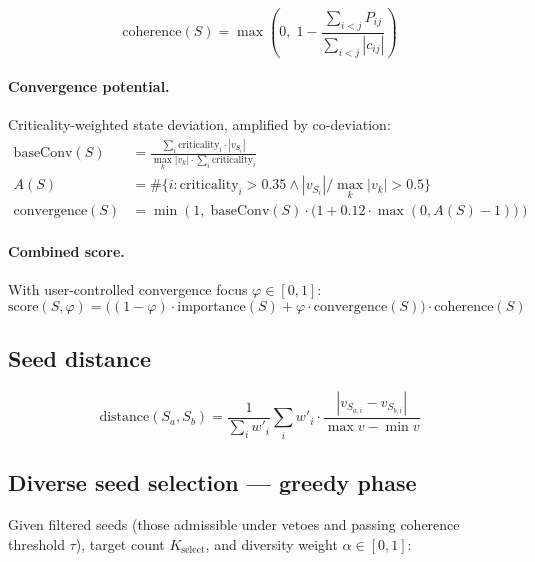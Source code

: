 \documentclass[11pt,a4paper]{article}
\begin{document}
\begin{equation}
\text{coherence}(S) = \max\left(0, \; 1 - \frac{\sum_{i<j} P_{ij}}{\sum_{i<j} |c_{ij}|}\right)
\end{equation}

\paragraph{Convergence potential.} Criticality-weighted state deviation, amplified by co-deviation:
\begin{align}
\text{baseConv}(S) &= \frac{\sum_i \text{criticality}_i \cdot |v_{S_i}|}{\max_k |v_k| \cdot \sum_i \text{criticality}_i}\\
A(S) &= \#\{i : \text{criticality}_i > 0.35 \land |v_{S_i}|/\max_k |v_k| > 0.5\}\\
\text{convergence}(S) &= \min\left(1, \; \text{baseConv}(S) \cdot \big(1 + 0.12 \cdot \max(0, A(S) - 1)\big)\right)
\end{align}

\paragraph{Combined score.} With user-controlled convergence focus $\varphi \in [0, 1]$:
\begin{equation}
\text{score}(S, \varphi) = \big((1-\varphi) \cdot \text{importance}(S) + \varphi \cdot \text{convergence}(S)\big) \cdot \text{coherence}(S)
\end{equation}

\subsection{Seed distance}

\begin{equation}
\text{distance}(S_a, S_b) = \frac{1}{\sum_i w'_i} \sum_i w'_i \cdot \frac{|v_{S_{a,i}} - v_{S_{b,i}}|}{\max v - \min v}
\end{equation}

\subsection{Diverse seed selection — greedy phase}

Given filtered seeds (those admissible under vetoes and passing coherence threshold $\tau$), target count $K_{\text{select}}$, and diversity weight $\alpha \in [0, 1]$:
\end{document}
